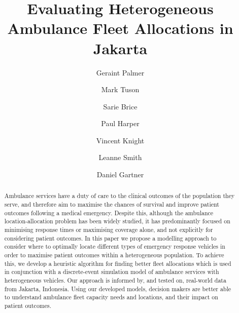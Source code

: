 \documentclass[preprint,12pt]{elsarticle}
\begin{document}
\begin{frontmatter}


\title{Evaluating Heterogeneous Ambulance Fleet Allocations in Jakarta}

\author[inst1]{Geraint Palmer}
\author[inst1]{Mark Tuson}
\author[inst1]{Sarie Brice}
\author[inst1]{Paul Harper}
\author[inst1]{Vincent Knight}
\author[inst2]{Leanne Smith}
\author[inst1,inst3]{Daniel Gartner}


            



 \begin{abstract}
 Ambulance services have a duty of care to the clinical outcomes of the population they serve, and therefore aim to maximise the chances of survival and improve patient outcomes following a medical emergency. Despite this, although the ambulance location-allocation problem has been widely studied, it has predominantly focused on minimising response times or maximising coverage alone, and not explicitly for considering patient outcomes. In this paper we propose a modelling approach to consider where to optimally locate different types of emergency response vehicles in order to maximise patient outcomes within a heterogeneous population.  To achieve this, we develop a heuristic algorithm for finding better fleet allocations which is used in conjunction with a discrete-event simulation model of ambulance services with heterogeneous vehicles. Our approach is informed by, and tested on, real-world data from Jakarta, Indonesia. Using our developed models, decision makers are better able to understand ambulance fleet capacity needs and locations, and their impact on patient outcomes.


\end{abstract}
\end{frontmatter}
\end{document}
